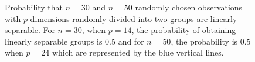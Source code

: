 \begin{figure}[hbtp]
   \centering
       \caption{Probability that $n =30$ and $n = 50$ randomly chosen observations with $p$ dimensions randomly divided into two groups are linearly separable. For $n = 30$, when $p = 14$, the probability of obtaining linearly separable groups is 0.5 and for $n = 50$, the probability is 0.5 when $p = 24$ which are represented by the blue vertical lines. }
       \label{combin}
\end{figure}





